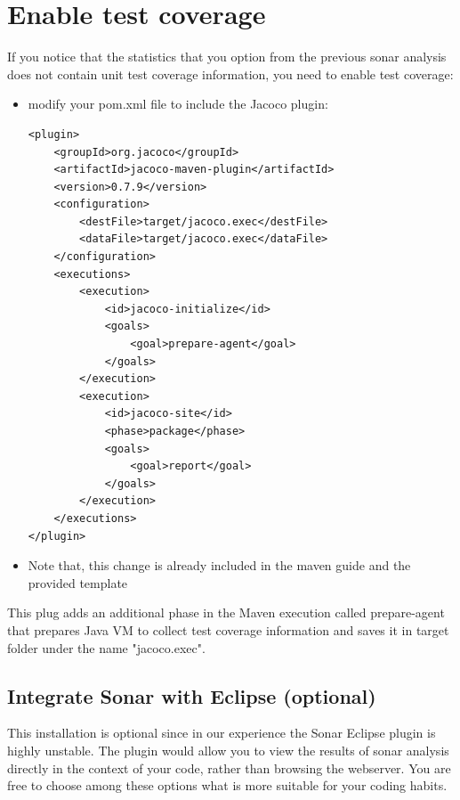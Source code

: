\documentclass{article}
\newif\ifinstall
\begin{document}
\ifinstall
\else
\section{Enable test coverage}
If you notice that the statistics that you option from the previous
sonar analysis does not contain unit test coverage information, you
need to enable test coverage:

\begin{itemize}
\item modify your pom.xml file to include the Jacoco plugin:
\begin{lstlisting}
<plugin>
	<groupId>org.jacoco</groupId>
	<artifactId>jacoco-maven-plugin</artifactId>
	<version>0.7.9</version>
	<configuration>
		<destFile>target/jacoco.exec</destFile>
		<dataFile>target/jacoco.exec</dataFile>
	</configuration>
	<executions>
		<execution>
			<id>jacoco-initialize</id>
			<goals>
				<goal>prepare-agent</goal>
			</goals>
		</execution>
		<execution>
			<id>jacoco-site</id>
			<phase>package</phase>
			<goals>
				<goal>report</goal>
			</goals>
		</execution>
	</executions>
</plugin>
\end{lstlisting}
\item Note that, this change is already included in the maven guide and the provided template

\end{itemize}
This plug adds an additional phase in the Maven execution called 
prepare-agent that prepares Java VM to collect test coverage
information and saves it in target folder under the name
"jacoco.exec". 


\fi

\subsection{Integrate Sonar with Eclipse (optional)}

This installation is optional since in our experience the Sonar
Eclipse plugin is highly unstable. The plugin would allow you to view
the results of sonar analysis directly in the context of your code,
rather than browsing the webserver. You are free to choose among these
options what is more suitable for your coding habits. 
\end{document}
